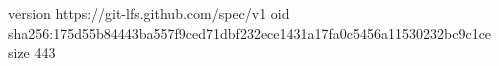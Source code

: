 version https://git-lfs.github.com/spec/v1
oid sha256:175d55b84443ba557f9ced71dbf232ece1431a17fa0c5456a11530232bc9c1ce
size 443
